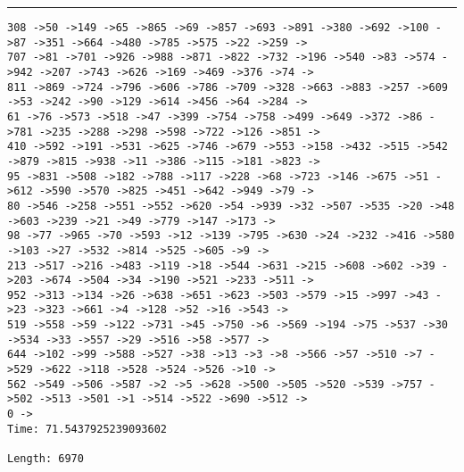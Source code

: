\documentclass[letter, 12pt]{article}
\newenvironment{question}[1]{%
    \vspace{.2in}%
        \noindent{\bf #1}%
    \vspace{0.3em} \hrule \vspace{.1in}%
}{}
\begin{document}
\begin{question}{\large Appendix}
\begin{lstlisting}[style=CStyle]
308 ->50 ->149 ->65 ->865 ->69 ->857 ->693 ->891 ->380 ->692 ->100 ->87 ->351 ->664 ->480 ->785 ->575 ->22 ->259 ->
707 ->81 ->701 ->926 ->988 ->871 ->822 ->732 ->196 ->540 ->83 ->574 ->942 ->207 ->743 ->626 ->169 ->469 ->376 ->74 ->
811 ->869 ->724 ->796 ->606 ->786 ->709 ->328 ->663 ->883 ->257 ->609 ->53 ->242 ->90 ->129 ->614 ->456 ->64 ->284 ->
61 ->76 ->573 ->518 ->47 ->399 ->754 ->758 ->499 ->649 ->372 ->86 ->781 ->235 ->288 ->298 ->598 ->722 ->126 ->851 ->
410 ->592 ->191 ->531 ->625 ->746 ->679 ->553 ->158 ->432 ->515 ->542 ->879 ->815 ->938 ->11 ->386 ->115 ->181 ->823 ->
95 ->831 ->508 ->182 ->788 ->117 ->228 ->68 ->723 ->146 ->675 ->51 ->612 ->590 ->570 ->825 ->451 ->642 ->949 ->79 ->
80 ->546 ->258 ->551 ->552 ->620 ->54 ->939 ->32 ->507 ->535 ->20 ->48 ->603 ->239 ->21 ->49 ->779 ->147 ->173 ->
98 ->77 ->965 ->70 ->593 ->12 ->139 ->795 ->630 ->24 ->232 ->416 ->580 ->103 ->27 ->532 ->814 ->525 ->605 ->9 ->
213 ->517 ->216 ->483 ->119 ->18 ->544 ->631 ->215 ->608 ->602 ->39 ->203 ->674 ->504 ->34 ->190 ->521 ->233 ->511 ->
952 ->313 ->134 ->26 ->638 ->651 ->623 ->503 ->579 ->15 ->997 ->43 ->23 ->323 ->661 ->4 ->128 ->52 ->16 ->543 ->
519 ->558 ->59 ->122 ->731 ->45 ->750 ->6 ->569 ->194 ->75 ->537 ->30 ->534 ->33 ->557 ->29 ->516 ->58 ->577 ->
644 ->102 ->99 ->588 ->527 ->38 ->13 ->3 ->8 ->566 ->57 ->510 ->7 ->529 ->622 ->118 ->528 ->524 ->526 ->10 ->
562 ->549 ->506 ->587 ->2 ->5 ->628 ->500 ->505 ->520 ->539 ->757 ->502 ->513 ->501 ->1 ->514 ->522 ->690 ->512 ->
0 ->
Time: 71.5437925239093602

Length: 6970


\end{lstlisting}
\end{question}
\end{document}
